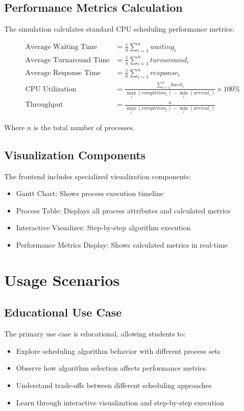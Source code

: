 \documentclass[12pt,a4paper]{report}
\begin{document}
\section{Performance Metrics Calculation}
The simulation calculates standard CPU scheduling performance metrics:

\begin{align}
\text{Average Waiting Time} &= \frac{1}{n} \sum_{i=1}^{n} waiting_i\\
\text{Average Turnaround Time} &= \frac{1}{n} \sum_{i=1}^{n} turnaround_i\\
\text{Average Response Time} &= \frac{1}{n} \sum_{i=1}^{n} response_i\\
\text{CPU Utilization} &= \frac{\sum_{i=1}^{n} burst_i}{\max_i(completion_i) - \min_i(arrival_i)} \times 100\%\\
\text{Throughput} &= \frac{n}{\max_i(completion_i) - \min_i(arrival_i)}
\end{align}

Where $n$ is the total number of processes.

\section{Visualization Components}
The frontend includes specialized visualization components:
\begin{itemize}
    \item Gantt Chart: Shows process execution timeline
    \item Process Table: Displays all process attributes and calculated metrics
    \item Interactive Visualizer: Step-by-step algorithm execution
    \item Performance Metrics Display: Shows calculated metrics in real-time
\end{itemize}

\chapter{Usage Scenarios}

\section{Educational Use Case}
The primary use case is educational, allowing students to:
\begin{itemize}
    \item Explore scheduling algorithm behavior with different process sets
    \item Observe how algorithm selection affects performance metrics
    \item Understand trade-offs between different scheduling approaches
    \item Learn through interactive visualization and step-by-step execution
\end{itemize}
\end{document}
